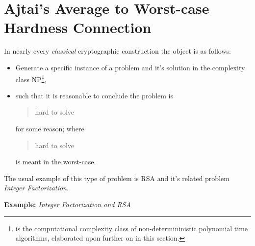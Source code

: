 

\chapter{Ajtai's Average to Worst-case Hardness Connection}




In nearly every \emph{classical} cryptographic construction the object is as follows:
\newline
\begin{itemize}
	\item Generate a specific instance of a problem and it's solution in the complexity class NP\footnote{\NP is the computational complexity class of non-determininistic polynomial time algorithms, elaborated upon further on in this section.},
	\item such that it is reasonable to conclude the problem is \begin{quotation} hard to solve \end{quotation} for some reason; where \begin{quotation} hard to solve \end{quotation} is meant in the worst-case.
\end{itemize}
\newline
The usual example of this type of problem is RSA and it's related problem \emph{Integer Factorization}. 

\medskip
{}

\bigskip
\textbf{Example:} \emph{Integer Factorization and RSA}
\newline

